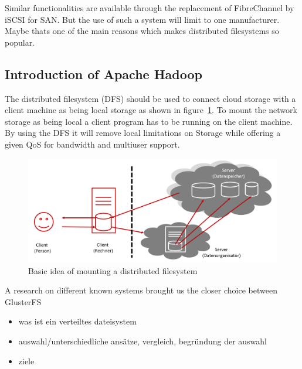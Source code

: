 Similar functionalities are available through the replacement of FibreChannel by iSCSI for SAN. But the use of such a system will limit to one manufacturer. Maybe thats one of the main reasons which makes distributed filesystems so popular.

\subsection{Introduction of Apache Hadoop}

The distributed filesystem (DFS) should be used to connect cloud storage with a client machine as being local storage as shown in figure~\ref{fig:dfs_example}. To mount the network storage as being local a client program has to be running on the client machine. By using the DFS it will remove local limitations on Storage while offering a given QoS for bandwidth and multiuser support.


\begin{figure}
	\centering
	\includegraphics[width=1\linewidth]{img/dfs_example.png}
	\caption{Basic idea of mounting a distributed filesystem}
	\label{fig:dfs_example}
\end{figure}

A research on different known systems brought us the closer choice between GlusterFS 


\begin{itemize}
	\item was ist ein verteiltes dateisystem
	\item auswahl/unterschiedliche ansätze, vergleich, begründung der auswahl
	\item ziele
\end{itemize}

